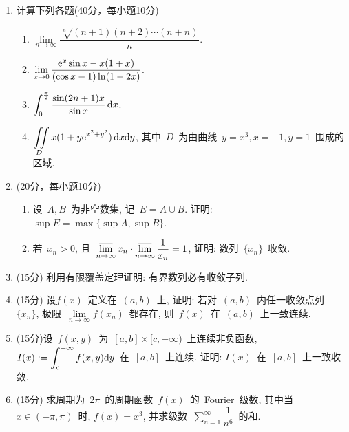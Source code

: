 \documentclass[UTF8,a4paper,11pt]{article}
\begin{document}
\begin{enumerate}
	\item 计算下列各题(40分，每小题10分)
	      \begin{enumerate}
		      \item $\lim\limits_{n\to\infty}\dfrac{\sqrt[n]{(n+1)(n+2)\cdots(n+n)}}{n}$.
		            \vspace{2em}
		      \item $\lim\limits_{x\to 0} \dfrac{\mathrm{e}^x\sin{x}-x(1+x)}{(\cos{x}-1)\ln(1-2x)}$.
		            \vspace{2em}
		      \item $\displaystyle\int_0^{\frac{\pi}{2}}\dfrac{\sin(2n+1)x}{\sin{x}}\,\mathrm{d}x$.
		            \vspace{2em}
		      \item $\displaystyle\iint\limits_D x(1+y\mathrm{e}^{x^2+y^2})\,\mathrm{d}x\mathrm{d}y$, 其中~$D$~为由曲线~$y=x^3,x=-1,y=1$~围成的区域.
		            \vspace{2em}
	      \end{enumerate}
	\item (20分，每小题10分)
	      \begin{enumerate}
		      \item 设~$A,B$~为非空数集, 记~$E=A\cup B$. 证明: $\sup{E}=\max\{\sup{A},\sup{B}\}$.
		      \item 若~$x_n>0$, 且~$\varlimsup\limits_{n\to\infty}x_n\cdot\varlimsup\limits_{n\to\infty}\dfrac{1}{x_n}=1$, 证明: 数列~$\{x_n\}$~收敛.
	      \end{enumerate}
	      \vspace{2em}
	\item (15分) 利用有限覆盖定理证明: 有界数列必有收敛子列.
	      \vspace{2em}
	\item (15分) 设$f(x)$~定义在~$(a,b)$~上, 证明: 若对~$(a,b)$~内任一收敛点列~$\{x_n\}$, 极限~$\lim\limits_{n\to\infty}f(x_n)$~都存在, 则~$f(x)$~在~$(a,b)$~上一致连续.
	      \vspace{2em}
	\item (15分)设~$f(x,y)$~为~$[a,b]\times[c,+\infty)$~上连续非负函数, $I(x):=\displaystyle\int_c^{+\infty}f(x,y)\mathrm{d}y$~在~$[a,b]$~上连续. 证明: $I(x)$~在~$[a,b]$~上一致收敛.
	      \vspace{2em}
	\item (15分) 求周期为~$2\pi$~的周期函数~$f(x)$~的~Fourier~级数, 其中当~$x\in(-\pi,\pi)$~时, $f(x)=x^3$, 并求级数~$\sum\limits_{n=1}^{\infty} \dfrac{1}{n^6}$~的和.

\end{enumerate}
\end{document}
